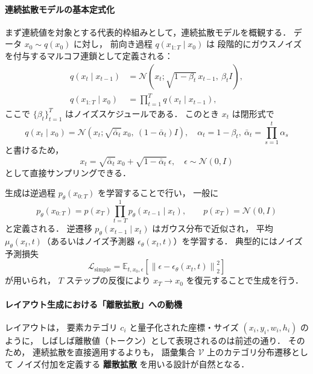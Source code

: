 \documentclass[a4j,12pt,dvipdfmx]{jsreport}
\begin{document}
\paragraph{連続拡散モデルの基本定式化}
まず連続値を対象とする代表的枠組みとして，連続拡散モデルを概観する．
データ $x_0 \sim q(x_0)$ に対し，
前向き過程 $q(x_{1:T}\mid x_0)$ は
段階的にガウスノイズを付与するマルコフ連鎖として定義される：
\begin{align}
   q(x_t \mid x_{t-1})
    & = \mathcal{N}\!\left(
   x_t;\sqrt{1-\beta_t}\,x_{t-1},\ \beta_t I
   \right),                                  \\
   q(x_{1:T}\mid x_0)
    & = \prod_{t=1}^{T} q(x_t \mid x_{t-1}),
\end{align}
ここで $\{\beta_t\}_{t=1}^{T}$ はノイズスケジュールである．
このとき $x_t$ は閉形式で
\begin{equation}
   q(x_t \mid x_0)
   = \mathcal{N}\!\left(
   x_t;\sqrt{\bar{\alpha}_t}\,x_0,\ (1-\bar{\alpha}_t)I
   \right),
   \quad
   \alpha_t=1-\beta_t,\ \bar{\alpha}_t=\prod_{s=1}^{t}\alpha_s
\end{equation}
と書けるため，
\begin{equation}
   x_t
   = \sqrt{\bar{\alpha}_t}\,x_0 + \sqrt{1-\bar{\alpha}_t}\,\epsilon,
   \quad \epsilon\sim\mathcal{N}(0,I)
\end{equation}
として直接サンプリングできる．

生成は逆過程 $p_\theta(x_{0:T})$ を学習することで行い，
一般に
\begin{equation}
   p_\theta(x_{0:T})
   = p(x_T)\prod_{t=T}^{1}p_\theta(x_{t-1}\mid x_t),
   \qquad
   p(x_T)=\mathcal{N}(0,I)
\end{equation}
と定義される．
逆遷移 $p_\theta(x_{t-1}\mid x_t)$ はガウス分布で近似され，
平均 $\mu_\theta(x_t,t)$（あるいはノイズ予測器 $\epsilon_\theta(x_t,t)$）を学習する．
典型的にはノイズ予測損失
\begin{equation}
   \mathcal{L}_{\text{simple}}
   =
   \mathbb{E}_{t,x_0,\epsilon}
   \left[
      \left\|
      \epsilon - \epsilon_\theta(x_t,t)
      \right\|_2^2
      \right]
\end{equation}
が用いられ，
$T$ ステップの反復により $x_T\!\to\!x_0$ を復元することで生成を行う．

\paragraph{レイアウト生成における「離散拡散」への動機}
レイアウトは，
要素カテゴリ $c_i$ と量子化された座標・サイズ
$(x_i,y_i,w_i,h_i)$ のように，
しばしば離散値（トークン）として表現されるのは前述の通り．
そのため，
連続拡散を直接適用するよりも，
語彙集合 $\mathcal{V}$ 上のカテゴリ分布遷移として
ノイズ付加を定義する
\textbf{離散拡散} を用いる設計が自然となる．
\end{document}
